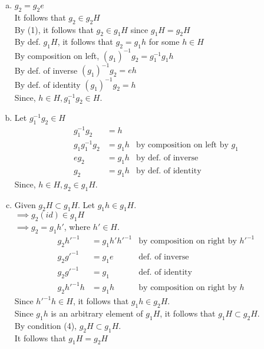 \begin{enumerate}[(a)]
\item
$g_2 = g_2 e$
\\
It follows that $g_2 \in g_2 H$
\\
By (1), it follows that $g_2 \in g_1 H$ since $g_1H = g_2 H$
\\
By def. $g_1 H$, it follows that $g_2 = g_1 h$ for some $h \in H$
\\
By composition on left, $(g_1)^{-1} g_2 = g_1^{-1} g_1 h$
\\
By def. of inverse $(g_1)^{-1} g_2 = eh$
\\
By def. of identity $(g_1)^{-1} g_2 = h$ 
\\
Since, $h \in H, g_1^{-1}g_2 \in H$.

\item
Let $g_1^{-1}g_2 \in H$
\begin{align*}
g_1^{-1}g_2 &= h
\\
g_1g_1^{-1}g_2 &= g_1h &\text{by composition on left by\ } g_1
\\
eg_2 &= g_1h &\text{by def. of inverse}
\\
g_2 &= g_1h &\text{by def. of identity}
\end{align*}
Since, $h \in H, g_2 \in g_1H$.


\item
Given $g_2H \subset g_1H$. Let $g_1h \in g_1H$.
\\
$\implies g_2(id) \in g_1H$
\\
$\implies g_2 = g_1h'$, where $h' \in H$.
\\
\begin{align*}
g_2h'^{-1} &=g_1h'h'^{-1} &\text{by composition on right by\ } h'^{-1}
\\
g_2g'^{-1} &= g_1e &\text{def. of inverse}
\\
g_2g'^{-1} &= g_1 &\text{def. of identity}
\\
g_2h'^{-1}h &= g_1h &\text{by composition on right by\ } h
\end{align*}
Since $h'^{-1} h \in H$, it follows that $g_1 h \in g_2 H$.
\\
Since $g_1 h$ is an arbitrary element of $g_1H$, it follows that $g_1H \subset g_2 H$.
\\
By condition (4), $g_2H \subset g_1 H$.
\\
It follows that $g_1 H = g_2 H$



\end{enumerate}
